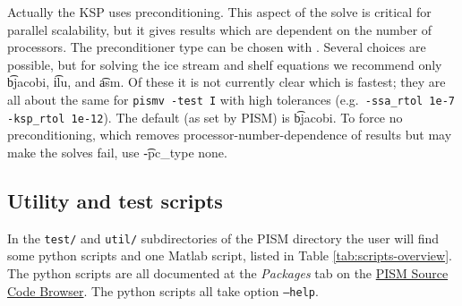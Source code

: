 Actually the KSP uses preconditioning.  This aspect of the solve is critical for parallel scalability, but it gives results which are dependent on the number of processors.  The preconditioner type can be chosen with . Several choices are possible, but for solving the ice stream and shelf equations we recommend only \t{bjacobi}, \t{ilu}, and \t{asm}.  Of these it is not currently clear which is fastest; they are all about the same for \texttt{pismv -test I} with high tolerances (e.g.~\texttt{-ssa_rtol 1e-7} \texttt{-ksp_rtol 1e-12}).  The default (as set by PISM) is \t{bjacobi}.  To force no preconditioning, which removes processor-number-dependence of results but may make the solves fail, use \t{-pc_type none}.


\subsection{Utility and test scripts} \label{subsect:scripts} In the \verb|test/| and \verb|util/| subdirectories of the PISM directory the user will find some python scripts and one Matlab script, listed in Table \ref{tab:scripts-overview}.  The python scripts are all documented at the \textsl{Packages} tab on the \href{http://www.pism-docs.org/doxy/html/index.html}{PISM Source Code Browser}.  The python scripts all take option \texttt{--help}.

\newcommand{\scripthead}[1]{\texttt{#1}}

